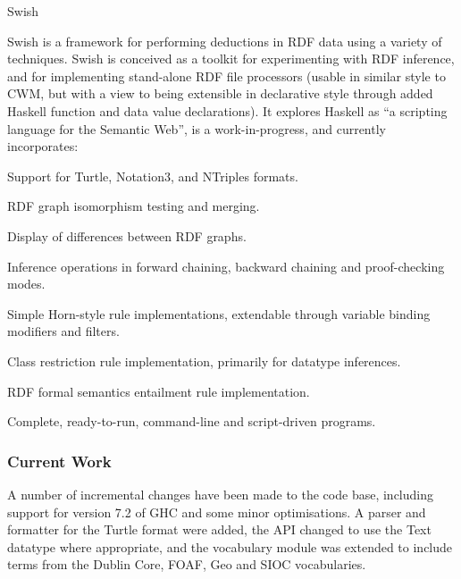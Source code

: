 \begin{hcarentry}[new]{Swish}
\makeheader

Swish is a framework for performing deductions in RDF data using a
variety of techniques. Swish is conceived as a toolkit for
experimenting with RDF inference, and for implementing stand-alone RDF
file processors (usable in similar style to CWM, but with a view to
being extensible in declarative style through added Haskell function
and data value declarations). It explores Haskell as ``a scripting
language for the Semantic Web'', is a work-in-progress, and currently
incorporates:

\begin{compactitem}
\item
Support for Turtle, Notation3, and NTriples formats.

\item
RDF graph isomorphism testing and merging.

\item
Display of differences between RDF graphs.

\item
Inference operations in forward chaining, backward chaining and proof-checking modes.

\item
Simple Horn-style rule implementations, extendable through variable binding modifiers and filters.

\item
Class restriction rule implementation, primarily for datatype inferences.

\item
RDF formal semantics entailment rule implementation.

\item
Complete, ready-to-run, command-line and script-driven programs.
\end{compactitem}

\subsubsection*{Current Work}

A number of incremental changes have been made to the code base,
including support for version 7.2 of GHC and some minor
optimisations. A parser and formatter for the Turtle format were
added, the API changed to use the Text datatype where appropriate, and
the vocabulary module was extended to include terms from the Dublin
Core, FOAF, Geo and SIOC vocabularies.


\end{hcarentry}
